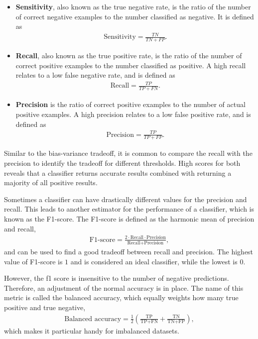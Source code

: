 \begin{itemize}
\item \textbf{Sensitivity}, also known as the true negative rate, is the ratio of the number of correct negative examples to the number classified as negative. It is defined as
\begin{align}
\text{Sensitivity} = \frac{TN}{TN + FP}.
\end{align}

\item \textbf{Recall}, also known as the true positive rate, is the ratio of the number of correct positive examples to the number classified as positive. A high recall relates to a low false negative rate, and is defined as
\begin{align}
\text{Recall} = \frac{TP}{TP + FN}.
\end{align}

\item \textbf{Precision} is the ratio of correct positive examples to the number of actual positive examples. A high precision relates to a low false positive rate, and is defined as  \\
\begin{align}
\text{Precision} = \frac{TP}{TP + FP}.
\end{align}
\end{itemize} Similar to the bias-variance tradeoff, it is common to compare the recall with the precision to identify the tradeoff for different thresholds. High scores for both reveals that a classifier returns accurate results combined with returning a majority of all positive results.


Sometimes a classifier can have drastically different values for the precision and recall. This leads to another estimator for the performance of a classifier, which is known as the F1-score. The F1-score is defined as the harmonic mean of precision and recall,
\begin{align*}
\text{F1-score} = \frac{2\cdot \text{Recall} \cdot \text{Precision}}{\text{Recall} + \text{Precision}},
\end{align*}
and can be used to find a good tradeoff between recall and precision. The highest value of F1-score is $1$ and is considered an ideal classifier, while the lowest is $0$.

However, the f1 score is insensitive to the number of negative predictions. Therefore, an adjustment of the normal accuracy is in place. The name of this metric is called the balanced accuracy, which equally weights how many true positive and true negative,
\begin{align*}
  \text{Balanced accuracy} = \frac{1}{2} \left( \frac{\text{TP}}{\text{TP} + \text{FN}} + \frac{\text{TN}}{\text{TN} + \text{FP}} \right),
\end{align*}
which makes it particular handy for imbalanced datasets.

